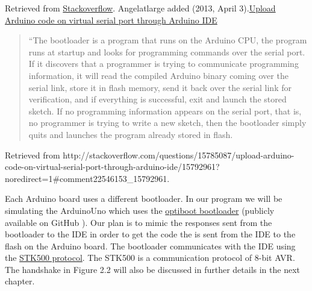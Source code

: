 Retrieved from \href{http://stackoverflow.com/questions/15785087/upload-arduino-code-on-virtual-serial-port-through-arduino-ide/15792961?noredirect=1#comment22546153_15792961}{Stackoverflow}. 
Angelatlarge added  (2013, April 3).\href{http://stackoverflow.com/questions/15785087/upload-arduino-code-on-virtual-serial-port-through-arduino-ide/15792961?noredirect=1#comment22546153_15792961}{Upload Arduino code on virtual serial port through Arduino IDE} \begin{quotation}``The bootloader is a program that runs on the Arduino CPU, the program runs at startup and looks for programming commands over the serial port. If it discovers that a programmer is trying to communicate programming information, it will read the compiled Arduino binary coming over the serial link, store it in flash memory, send it back over the serial link for verification, and if everything is successful, exit and launch the stored sketch. If no programming information appears on the serial port, that is, no programmer is trying to write a new sketch, then the bootloader simply quits and launches the program already stored in flash.\end{quotation} Retrieved from http://stackoverflow.com/questions/15785087/upload-arduino-code-on-virtual-serial-port-through-arduino-ide/15792961?noredirect=1#comment22546153_15792961. 

Each Arduino board uses a different bootloader. In our program we will be simulating the ArduinoUno which uses the \href{https://github.com/arduino/Arduino/tree/master/hardware/arduino/bootloaders/optiboot}{optiboot bootloader} (publicly available on GitHub \cite{GitHub:URL}). Our plan is to mimic the responses sent from the bootloader to the IDE in order to get the code the is sent from the IDE to the flash on the Arduino board. The bootloader communicates with the IDE using the \href{http://www.atmel.com/Images/doc2525.pdf}{STK500 protocol}. The STK500 is a communication protocol of 8-bit AVR. The handshake in Figure 2.2 will also be discussed in further details in the next chapter.

